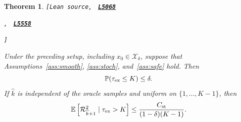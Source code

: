 \documentclass[11pt]{article}
\newtheorem{theorem}{Theorem}[section]
\theoremstyle{definition}
\theoremstyle{remark}
\numberwithin{equation}{section}
\numberwithin{figure}{section}
\numberwithin{table}{section}
\numberwithin{algorithm}{section}
\newcommand{\E}{\mathbb{E}}
\newcommand{\leanLinkText}[1]{%
  \underline{\textbf{#1}}%
}
\newcommand{\leanDeclTag}[2]{%
  {\footnotesize\texttt{[Lean source, }}%
  \href{https://github.com/optpku/ReasBook/blob/v4.32.2/ReasBook/Papers/TR_LALM_theory/#1?plain=1\#L#2}%
    {\leanLinkText{\footnotesize\texttt{L#2}}}%
}
\newcommand{\leanDeclTagExtra}[2]{%
  \unskip
  {\footnotesize\texttt{, }}%
  \href{https://github.com/optpku/ReasBook/blob/v4.32.2/ReasBook/Papers/TR_LALM_theory/#1?plain=1\#L#2}%
    {\leanLinkText{\footnotesize\texttt{L#2}}}\allowbreak
}
\newcommand{\leanDeclTagEnd}{%
  \unskip
  {\footnotesize\texttt{]}}\enspace
}
\begin{document}
\begin{theorem}
\label{thm:stochlocalization}
\leanDeclTag{Theorem_3_7.lean}{5068}
\leanDeclTagExtra{Theorem_3_7.lean}{5558}
\leanDeclTagEnd
Under the preceding setup, including \(x_0\in\mathcal X_\delta\), suppose that
Assumptions~\ref{ass:smooth}, \ref{ass:stoch}, and~\ref{ass:safe} hold.  Then
\begin{equation}
    \mathbb P(\tau_{\rm ex}\le K)\le\delta.
    \label{eq:exitprob}
\end{equation}
If \(\widehat{k}\) is independent of the oracle samples and uniform on
$\{1,\ldots,K-1\}$, then
\begin{equation}
    \E\left[\mathcal R_{\widehat{k}+1}^2\mid\tau_{\rm ex}>K\right]
    \le\frac{C_{\mathrm{st}}}
             {(1-\delta)(K-1)}.
    \label{eq:conditionalstochrate}
\end{equation}
\end{theorem}
\end{document}
